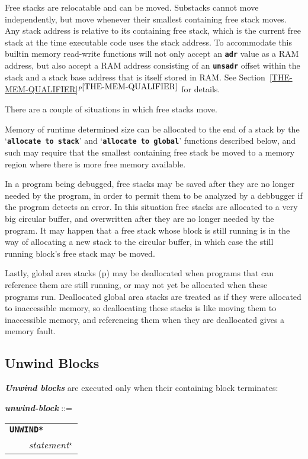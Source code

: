 \documentclass[12pt]{article}
\makeatletter
\newcommand{\TT}[1]{{\tt \bfseries #1}}
\newcommand{\ikey}[2]{{\bf \em #1}\index{#2}}
\newcommand{\ttkey}[1]{\TT{#1}\index{#1@{\tt #1}}}
\newcommand{\emkey}[1]{{\bf \em #1}\index{#1@{\em #1}}}
\newcommand{\itemref}[1]{\ref{#1}$^{p\pageref{#1}}$}
\newcommand{\pagref}[1]{p\pageref{#1}}
\newcommand{\STAR}{{\Large $^\star$}}
\newenvironment{indpar}[1][0.3in]%
	{\begin{list}{}%
		     {\setlength{\itemsep}{0in}%
		      \setlength{\topsep}{0in}%
		      \setlength{\parsep}{1ex}%
		      \setlength{\labelwidth}{#1}%
		      \setlength{\leftmargin}{#1}%
		      \addtolength{\leftmargin}{\labelsep}}%
	 \item}%
	{\end{list}}
\makeatother
\begin{document}
Free stacks are relocatable and can be moved.
Substacks cannot move independently,
but move whenever their smallest containing free stack moves.
Any stack address is relative to its containing free stack,
which is the current free stack at the time executable code uses
the stack address.  To accommodate this builtin memory read-write
functions will not only accept an \TT{adr} value as a RAM address,
but also accept a RAM address consisting of an \TT{unsadr}
offset within the stack and a stack base address that is itself
stored in RAM.  See Section~\itemref{THE-MEM-QUALIFIER} for details.

There are a couple of situations in which free stacks move.

Memory of runtime determined size can be allocated to the end of
a stack by the `\TT{allocate to stack}' and `\TT{allocate to global}'
functions described below, and such may
require that the smallest containing free stack
be moved to a memory region where there is more free memory available.

In a program being debugged, free stacks may be saved after they are no
longer needed by the program, in order to permit them to be analyzed
by a debbugger if the program detects an error.  In this situation
free stacks are allocated to a very big circular buffer, and overwritten
after they are no longer needed by the program.  It may happen that
a free stack whose block is still running is in the way of allocating
a new stack to the circular buffer, in which case the still running
block's free stack may be moved.

Lastly, global area stacks (\pagref{GLOBAL-AREAS})
may be deallocated when programs that
can reference them are still running, or may not yet be allocated
when these programs run.  Deallocated global area stacks are treated as if
they were allocated to inaccessible memory, so deallocating these stacks
is like moving them to inaccessible memory, and referencing
them when they are deallocated gives a memory fault.


\subsection{Unwind Blocks}
\label{UNWIND-BLOCKS}

\ikey{Unwind blocks}{unwind block} are executed only when their
containing block terminates:

\begin{indpar}
\emkey{unwind-block}
    ::= \begin{tabular}[t]{l}
	\ttkey{*UNWIND*}\TT{:} \\
	\TT{~~~~}{\em statement}\STAR{} \\
	\end{tabular}
\end{indpar}
\end{document}
